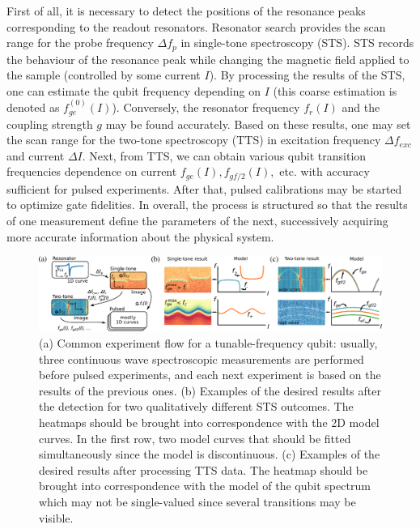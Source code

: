 \documentclass[%
 aip,
 amsmath,amssymb,
 reprint,%
]{revtex4-1}
\begin{document}
First of all, it is necessary to detect the positions of the resonance peaks corresponding to the readout resonators. Resonator search provides the scan range for the probe frequency $\Delta f_p$ in single-tone spectroscopy (STS). STS records the behaviour of the resonance peak while changing the magnetic field applied to the sample (controlled by some current $I$). By processing the results of the STS, one can estimate the qubit frequency depending on $I$ (this coarse estimation is denoted as  $f^{(0)}_{ge}(I)$). Conversely, the resonator frequency $f_r(I)$ and the coupling strength $g$  may be found accurately. Based on these results, one may set the scan range for the two-tone spectroscopy (TTS) in excitation frequency $\Delta f_{exc}$ and current $\Delta I$. Next, from TTS, we can obtain various qubit transition frequencies dependence on current $f_{ge}(I), f_{gf/2}(I),$ etc. with accuracy sufficient for pulsed experiments.  After that, pulsed calibrations may be started to optimize gate fidelities. In overall, the process is structured so that the results of one measurement define the parameters of the next, successively acquiring more accurate information about the physical system.

\begin{figure}
	\centering
	\includegraphics[width=\linewidth]{detection}
	\caption{(a) Common experiment flow for a tunable-frequency qubit: usually, three continuous wave spectroscopic measurements are performed before pulsed experiments, and each next experiment is based on the results of the previous ones. (b) Examples of the desired results after the detection for two qualitatively different STS outcomes. The heatmaps should be brought into correspondence with the 2D model curves. In the first row, two model curves that should be fitted simultaneously since the model is discontinuous. (c) Examples of the desired results after processing TTS data. The heatmap should be brought into correspondence with the model of the qubit spectrum which may not be single-valued since several transitions may be visible.}
	\label{fig:detection}	
\end{figure} 
\end{document}

